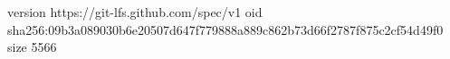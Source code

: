 version https://git-lfs.github.com/spec/v1
oid sha256:09b3a089030b6e20507d647f779888a889c862b73d66f2787f875c2cf54d49f0
size 5566
